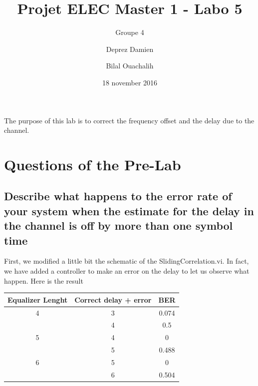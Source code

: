 \documentclass[frenchb, oneside, headings=normal]{scrartcl}
\begin{document}
\title{Projet ELEC Master 1 - Labo 5}
\subtitle{Groupe 4}
\author{Deprez Damien \and Bilal Ouachalih }
\date{18 november 2016}
\maketitle

The purpose of this lab is to correct the frequency offset and the delay due to the channel.

\section{Questions of the Pre-Lab}

\subsection{Describe what happens to the error rate of your system when the estimate for the delay in the channel is off by more than one symbol time}

First, we modified a little bit the schematic of the SlidingCorrelation.vi. In fact, we have added a controller to make an error on the delay to let us observe what happen. Here is the result\\

\begin{center}
	\begin{tabular}{c|c|c}
		 Equalizer Lenght & Correct delay + error & BER\\
		\hline
		 4& 3 & 0.074\\
		  & 4 & 0.5 \\
		  \hline
		 5 & 4  & 0  \\
		   & 5  & 0.488  \\
		  \hline
		6 & 5  & 0 \\
		 &  6  & 0.504 \\   
	\end{tabular}
	\label{BER_equ_length_4}
    \end{center}
\end{document}
